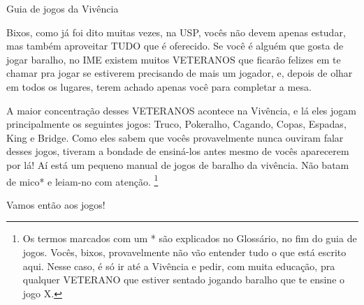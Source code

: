 \begin{secao}{Guia de jogos da Vivência }

Bixos, como já foi dito muitas vezes, na USP, vocês não devem apenas estudar, mas
também aproveitar TUDO que é oferecido. Se você é alguém que gosta de jogar
baralho, no IME existem muitos VETERANOS que ficarão felizes em te chamar pra
jogar se estiverem precisando de mais um jogador, e, depois de olhar em todos
os lugares, terem achado apenas você para completar a mesa. 

A maior concentração desses VETERANOS acontece na Vivência, e lá eles jogam
principalmente os seguintes jogos: Truco, Pokeralho, Cagando, Copas, Espadas,
King e Bridge. Como eles sabem que vocês provavelmente nunca ouviram falar desses jogos,
tiveram a bondade de ensiná-los antes mesmo de vocês aparecerem por lá! Aí está um
pequeno manual de jogos de baralho da vivência. Não batam de mico* e
leiam-no com atenção. \footnote{Os termos marcados com um * são explicados no Glossário, no fim do guia de
jogos. Vocês, bixos, provavelmente não vão entender tudo o que está escrito aqui.
Nesse caso, é só ir até a Vivência e pedir, com muita educação, pra qualquer 
VETERANO que estiver sentado jogando baralho que te ensine o jogo X.}

Vamos então aos jogos!










\end{secao}
